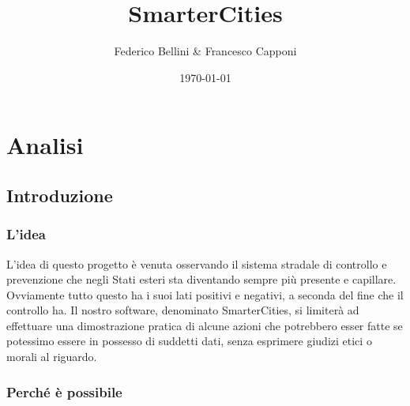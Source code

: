 \documentclass[a4paper,12pt]{report}
\begin{document}
\title{SmarterCities}
 
\author{Federico Bellini \& Francesco Capponi}

\date{\today}
 
\maketitle

\tableofcontents
 
\vfill
\chapter{Analisi}
\section{Introduzione}
\subsection*{L'idea}
L’idea di questo progetto è venuta osservando il sistema stradale di controllo 
e prevenzione che negli Stati esteri sta diventando sempre più presente e 
capillare. Ovviamente tutto questo ha i suoi lati positivi e negativi, a 
seconda del fine che il controllo ha. Il nostro software, denominato 
SmarterCities, si limiterà ad effettuare una dimostrazione pratica di alcune 
azioni che potrebbero esser fatte se potessimo essere in possesso di suddetti 
dati, senza esprimere giudizi etici o morali al riguardo.

\subsection*{Perché è possibile}
\end{document}
